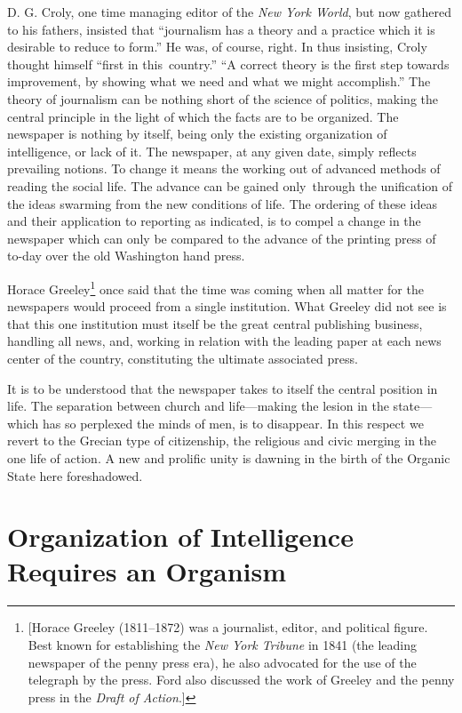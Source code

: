 \documentclass[twoside,symmetric,nobib,justified]{tufte-book}
\let\oldchapter\chapter
\def\chapter{%
  \setcounter{footnote}{0}%
  \oldchapter
}
\begin{document}
D. G. Croly, one time managing editor of the \emph{New York World}, but
now gathered to his fathers, insisted that ``journalism has a theory and
a practice which it is desirable to reduce to form.'' He was, of course,
right. In thus insisting, Croly thought himself ``first in
this~country.'' ``A correct theory is the first step towards
improvement, by showing what we need and what we might accomplish.'' The
theory of journalism can be nothing short of the science of politics,
making the central principle in the light of which the facts are to be
organized. The newspaper is nothing by itself, being only the existing
organization of intelligence, or lack of it. The newspaper, at any given
date, simply reflects prevailing notions. To change it means the working
out of advanced methods of reading the social life. The advance can be
gained only~through the unification of the ideas swarming from the new
conditions of life. The ordering of these ideas and their application to
reporting as indicated, is to compel a change in the newspaper which can
only be compared to the advance of the printing press of to-day over the
old Washington hand press.~

Horace Greeley\footnote{{[}Horace Greeley (1811--1872) was a journalist,
  editor, and political figure. Best known for establishing the
  \emph{New York Tribune} in 1841 (the leading newspaper of the penny
  press era), he also advocated for the use of the telegraph by the
  press. Ford also discussed the work of Greeley and the penny press in
  the \emph{Draft of Action}.{]}} once said that the time was coming
when all matter for the newspapers would proceed from a single
institution. What Greeley did not see is that this one institution must
itself be the great central publishing business, handling all news, and,
working in relation with the leading paper at each news center of the
country, constituting the ultimate associated press.~

It is to be understood that the newspaper takes to itself the central
position in life. The separation between church and life---making the
lesion in the state---which has so perplexed the minds of men, is to
disappear. In this respect we revert to the Grecian type of citizenship,
the religious and civic merging in the one life of action. A new and
prolific unity is dawning in the birth of the Organic State here
foreshadowed.~


\chapter[Organization of Intelligence Requires an Organism]{Organization of Intelligence Requires an Organism}
\label{ch:Organization of Intelligence Requires an Organism}
\end{document}
